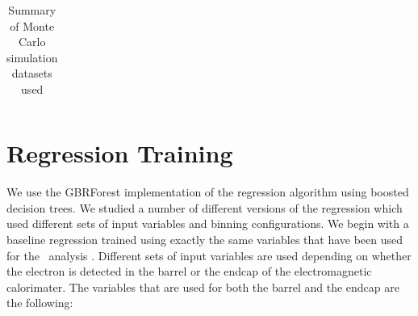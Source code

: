 \documentclass{cmspaper}
\begin{document}
\begin{table}[!ht]
\begin{center}
\begin{tabular}{|c|c|}
\hline
\end{tabular}
\caption{Summary of Monte Carlo simulation datasets used}
  \label{tab:MCDatasets}
\end{center}
\end{table}

\section{Regression Training}
\label{sec:regressiontraining}

We use the GBRForest implementation of the regression algorithm using boosted decision trees. We studied a number of different versions of the
regression which used different sets of input variables and binning configurations. We begin with a baseline regression trained using 
exactly the same variables that have been used for the \HiggsToGammaGamma\ analysis \cite{HggICHEP2012Note}. Different sets of input 
variables are used depending on whether the electron is detected in the barrel or the endcap of the electromagnetic calorimater.
The variables that are used for both the barrel and the endcap are the following:
\end{document}
